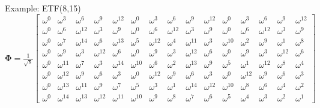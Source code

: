 \documentclass[12pt]{beamer}
\newcommand{\bfPhi}{\boldsymbol{\Phi}}
\begin{document}
\begin{frame}{Example: ETF(8,15)}
\footnotesize{
\begin{equation*}
\bfPhi=\tfrac{1}{\sqrt{8}}\left[
\begin{array}{ccccccccccccccc}
 \omega^{ 0}  &   \omega^{ 3}  &   \omega^{ 6}  &   \omega^{ 9}  &   \omega^{12}  &   \omega^{ 0}  &   \omega^{ 3}  &   \omega^{ 6}  &   \omega^{ 9}  &   \omega^{12}  &   \omega^{ 0}  &   \omega^{ 3}  &   \omega^{ 6}  &   \omega^{ 9}  &   \omega^{12}\\
 \omega^{ 0}  &   \omega^{ 6}  &   \omega^{12}  &   \omega^{ 3}  &   \omega^{ 9}  &   \omega^{ 0}  &   \omega^{ 6}  &   \omega^{12}  &   \omega^{ 3}  &   \omega^{ 9}  &   \omega^{ 0}  &   \omega^{ 6}  &   \omega^{12}  &   \omega^{ 3}  &   \omega^{ 9}\\
 \omega^{ 0}  &   \omega^{ 7}  &   \omega^{14}  &   \omega^{ 6}  &   \omega^{13}  &   \omega^{ 5}  &   \omega^{12}  &   \omega^{ 4}  &   \omega^{11}  &   \omega^{ 3}  &   \omega^{10}  &   \omega^{ 2}  &   \omega^{ 9}  &   \omega^{ 1}  &   \omega^{ 8}\\
 \omega^{ 0}  &   \omega^{ 9}  &   \omega^{ 3}  &   \omega^{12}  &   \omega^{ 6}  &   \omega^{ 0}  &   \omega^{ 9}  &   \omega^{ 3}  &   \omega^{12}  &   \omega^{ 6}  &   \omega^{ 0}  &   \omega^{ 9}  &   \omega^{ 3}  &   \omega^{12}  &   \omega^{ 6}\\
 \omega^{ 0}  &   \omega^{11}  &   \omega^{ 7}  &   \omega^{ 3}  &   \omega^{14}  &   \omega^{10}  &   \omega^{ 6}  &   \omega^{ 2}  &   \omega^{13}  &   \omega^{ 9}  &   \omega^{ 5}  &   \omega^{ 1}  &   \omega^{12}  &   \omega^{ 8}  &   \omega^{ 4}\\
 \omega^{ 0}  &   \omega^{12}  &   \omega^{ 9}  &   \omega^{ 6}  &   \omega^{ 3}  &   \omega^{ 0}  &   \omega^{12}  &   \omega^{ 9}  &   \omega^{ 6}  &   \omega^{ 3}  &   \omega^{ 0}  &   \omega^{12}  &   \omega^{ 9}  &   \omega^{ 6}  &   \omega^{ 3}\\
 \omega^{ 0}  &   \omega^{13}  &   \omega^{11}  &   \omega^{ 9}  &   \omega^{ 7}  &   \omega^{ 5}  &   \omega^{ 3}  &   \omega^{ 1}  &   \omega^{14}  &   \omega^{12}  &   \omega^{10}  &   \omega^{ 8}  &   \omega^{ 6}  &   \omega^{ 4}  &   \omega^{ 2}\\
 \omega^{ 0}  &   \omega^{14}  &   \omega^{13}  &   \omega^{12}  &   \omega^{11}  &   \omega^{10}  &   \omega^{ 9}  &   \omega^{ 8}  &   \omega^{ 7}  &   \omega^{ 6}  &   \omega^{ 5}  &   \omega^{ 4}  &   \omega^{ 3}  &   \omega^{ 2}  &   \omega^{ 1}
\end{array}
\right]
\end{equation*}
}

\end{frame}
\end{document}
